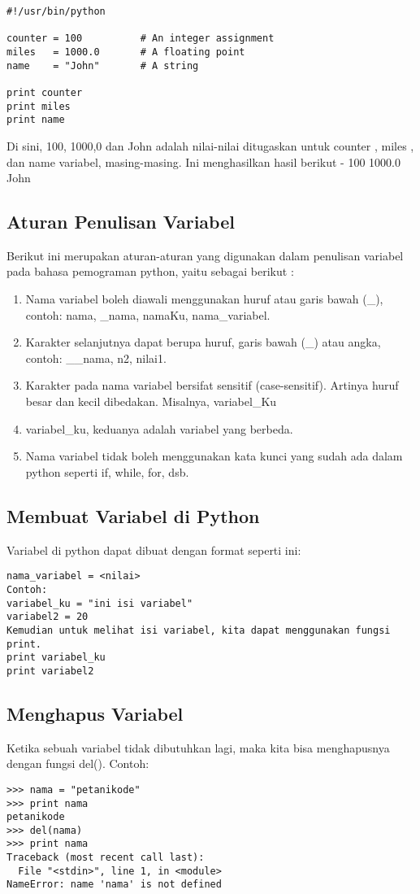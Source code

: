 \begin{verbatim}
#!/usr/bin/python

counter = 100          # An integer assignment
miles   = 1000.0       # A floating point
name    = "John"       # A string

print counter
print miles
print name
\end{verbatim}

Di sini, 100, 1000,0 dan John adalah nilai-nilai ditugaskan untuk counter , miles , dan name variabel, masing-masing. Ini menghasilkan hasil berikut -
100
1000.0
John

\subsection{Aturan Penulisan Variabel}
Berikut ini merupakan aturan-aturan yang digunakan dalam penulisan variabel pada bahasa pemograman python, yaitu sebagai berikut :
\begin{enumerate}
	\item Nama variabel boleh diawali menggunakan huruf atau garis bawah (_), contoh: nama, _nama, namaKu, nama_variabel.
	\item Karakter selanjutnya dapat berupa huruf, garis bawah (_) atau angka, contoh: __nama, n2, nilai1.
	\item Karakter pada nama variabel bersifat sensitif (case-sensitif). Artinya huruf besar dan kecil dibedakan. Misalnya, variabel_Ku
	\item variabel_ku, keduanya adalah variabel yang berbeda.
	\item Nama variabel tidak boleh menggunakan kata kunci yang sudah ada dalam python seperti if, while, for, dsb.
\end{enumerate}  

\subsection{Membuat Variabel di Python}
Variabel di python dapat dibuat dengan format seperti ini:

\begin{verbatim}
nama_variabel = <nilai>
Contoh:
variabel_ku = "ini isi variabel"
variabel2 = 20
Kemudian untuk melihat isi variabel, kita dapat menggunakan fungsi print.
print variabel_ku
print variabel2
\end{verbatim}

\subsection{Menghapus Variabel}
Ketika sebuah variabel tidak dibutuhkan lagi, maka kita bisa menghapusnya dengan fungsi del().
Contoh:
\begin{verbatim}
>>> nama = "petanikode"
>>> print nama
petanikode
>>> del(nama)
>>> print nama
Traceback (most recent call last):
  File "<stdin>", line 1, in <module>
NameError: name 'nama' is not defined
\end{verbatim}

